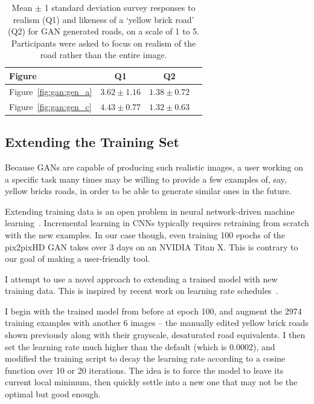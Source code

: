 \documentclass[10pt,twocolumn,letterpaper]{article}
\begin{document}
\begin{table}[htb]
\caption{Mean $\pm$ 1 standard deviation survey responses to realism (Q1) and likeness of a `yellow brick road' (Q2) for GAN generated roads, on a scale of 1 to 5. Participants were asked to focus on realism of the road rather than the entire image.}
\vskip 0.15in
\begin{center}
\begin{small}
\begin{sc}
\begin{tabular}{lccr}
\toprule
Figure				 		& Q1				& Q2 			   \\
\midrule
Figure~\ref{fig:gan:gen_a} 	& $3.62 \pm 1.16$	& $1.38 \pm 0.72$  \\
Figure~\ref{fig:gan:gen_c} 	& $4.43 \pm 0.77$	& $1.32 \pm 0.63$  \\
\bottomrule
\end{tabular}
\end{sc}
\end{small}
\end{center}
\vskip -0.1in
\label{tab:gan}
\end{table}

\subsection{Extending the Training Set}

Because GANs are capable of producing such realistic images, a user working on a specific task many times may be willing to provide a few examples of, say, yellow bricks roads, in order to be able to generate similar ones in the future.

Extending training data is an open problem in neural network-driven machine learning~\cite{sarwar2017incremental}. Incremental learning in CNNs typically requires retraining from scratch with the new examples. In our case though, even training 100 epochs of the pix2pixHD GAN takes over 3 days on an NVIDIA Titan X. This is contrary to our goal of making a user-friendly tool.

I attempt to use a novel approach to extending a trained model with new training data. This is inspired by recent work on learning rate schedules~\cite{loshchilov2016sgdr}.

I begin with the trained model from before at epoch 100, and augment  the 2974 training examples with another 6 images -- the manually edited yellow brick roads shown previously along with their grayscale, desaturated road equivalents. I then set the learning rate much higher than the default (which is 0.0002), and modified the training script to decay the learning rate according to a cosine function over 10 or 20 iterations. The idea is to force the model to leave its current local minimum, then quickly settle into a new one that may not be the optimal but good enough.
\end{document}
